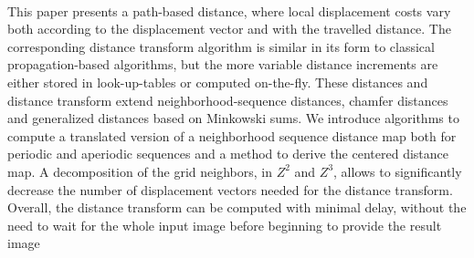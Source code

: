 {{\begin{enumerate}
\\ \aabstract
This paper presents a path-based distance, where local displacement costs vary both according to the displacement vector and with the travelled distance. The corresponding distance transform algorithm is similar in its form to classical propagation-based algorithms, but the more variable distance increments are either stored in look-up-tables or computed on-the-fly. These distances and distance transform extend neighborhood-sequence distances, chamfer distances and generalized distances based on Minkowski sums. We introduce algorithms to compute a translated version of a neighborhood sequence distance map both for periodic and aperiodic sequences and a method to derive the centered distance map. A decomposition of the grid neighbors, in $Z^2$ and $Z^3$, allows to significantly decrease the number of displacement vectors needed for the distance transform. Overall, the distance transform can be computed with minimal delay, without the need to wait for the whole input image before beginning to provide the result image


\end{enumerate}}}
